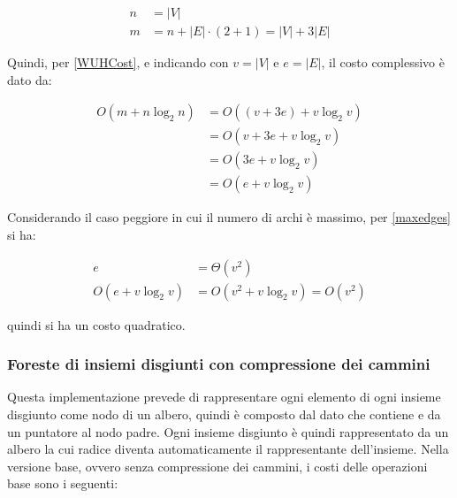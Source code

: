 \begin{equation}
    \begin{aligned}
        n & = |V|                                 \\
        m & = n + |E| \cdot (2 + 1) = |V| + 3 |E|
    \end{aligned}
\end{equation}

Quindi, per \eqref{WUHCost}, e indicando con $v = |V|$ e $e = |E|$, il costo complessivo è dato da:

\begin{equation}
    \begin{aligned}
        O(m+n\log_2n) & = O((v + 3 e) + v\log_2v) \\
                      & = O(v + 3 e + v\log_2v)   \\
                      & = O(3e+ v\log_2v)         \\
                      & = O(e + v\log_2v)
    \end{aligned}
\end{equation}

Considerando il caso peggiore in cui il numero di archi è massimo, per \eqref{maxedges} si ha:

\begin{equation}
    \begin{aligned}
        e             & = \Theta(v^2)               \\
        O(e+v\log_2v) & = O(v^2+ v\log_2v) = O(v^2)
    \end{aligned}
\end{equation}

quindi si ha un costo quadratico.
\newpage

\subsubsection{Foreste di insiemi disgiunti con compressione dei cammini}
Questa implementazione prevede di rappresentare ogni elemento di ogni insieme disgiunto
come nodo di un albero, quindi è composto dal dato che contiene e da un puntatore al nodo
padre. Ogni insieme disgiunto è quindi rappresentato da un albero la cui radice diventa
automaticamente il rappresentante dell'insieme. Nella versione base, ovvero senza compressione
dei cammini, i costi delle operazioni base sono i seguenti:

